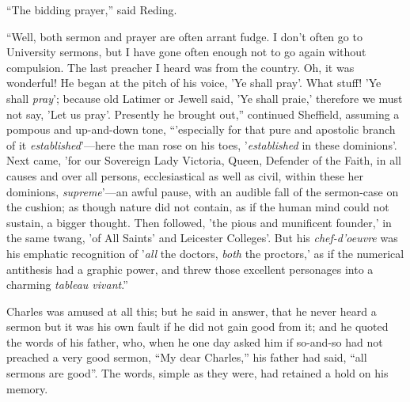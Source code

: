 ``The bidding prayer,'' said Reding.

``Well, both sermon and prayer are often arrant fudge. I don't
often go to University sermons, but I have gone often enough not to go
again without compulsion. The last preacher I heard was from the
country. Oh, it was wonderful! He began at the pitch of his voice, 'Ye
shall pray'. What stuff! 'Ye shall \emph{pray}'; because old Latimer
or Jewell said, 'Ye shall praie,' therefore we must not say, 'Let us
pray'. Presently he brought out,'' continued Sheffield, assuming a
pompous and up-and-down tone, ``'especially for that pure and
apostolic branch of it \emph{established}'—here the man rose on his
toes, '\emph{established} in these dominions'. Next came, 'for our
Sovereign Lady Victoria, Queen, Defender of the Faith, in all causes
and over all persons, ecclesiastical as well as civil, within these
her dominions, \emph{supreme}'—an awful pause, with an audible fall
of the sermon-case on the cushion; as though nature did not contain,
as if the human mind could not sustain, a bigger thought. Then
followed, 'the pious and munificent founder,' in the same twang, 'of
All Saints' and Leicester Colleges'. But his \emph{chef-d'oeuvre} was
his emphatic recognition of '\emph{all} the doctors, \emph{both} the
proctors,' as if the numerical antithesis had a graphic power, and
threw those excellent personages into a charming \emph{tableau vivant}.''

Charles was amused at all this; but he said in answer, that he
never heard a sermon but it was his own fault if he did not gain good
from it; and he quoted the words of his father, who, when he one day
asked him if so-and-so had not preached a very good sermon, ``My
dear Charles,'' his father had said, ``all sermons are
good''. The words, simple as they were, had retained a hold on his
memory.

